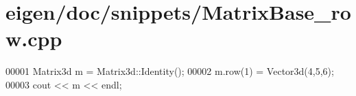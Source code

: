 \hypertarget{eigen_2doc_2snippets_2_matrix_base__row_8cpp_source}{}\section{eigen/doc/snippets/\+Matrix\+Base\+\_\+row.cpp}
\label{eigen_2doc_2snippets_2_matrix_base__row_8cpp_source}

\begin{DoxyCode}
00001 Matrix3d m = Matrix3d::Identity();
00002 m.row(1) = Vector3d(4,5,6);
00003 cout << m << endl;
\end{DoxyCode}
